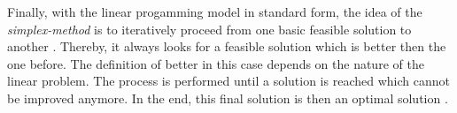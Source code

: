 Finally, with the linear progamming model in standard form, the idea of the \textit{simplex-method}
is to iteratively proceed from one basic feasible solution to another .
Thereby, it always looks for a feasible solution which is better then the one before. 
The definition of better in this case depends on the nature of the linear problem. 
The process is performed until a solution is reached which cannot 
be improved anymore. In the end, this final solution is then an optimal solution . 

\clearpage
\begin{comment}



# market design
Mathematical Optimization plays a central role in the design and analysis of multi-object 
markets and also provides a central foundation for theoretical models of mulit-object markets. 

However, market design is more than mathematical programming, as it takes into consideration bidding
strategies and human behavior. Ignoring bidding strategies and different types of manipulation 
in market-based resource allocation is like optimizing a problem with the wrong parameters. 

Overall, makret design aims at design principles and rules for market institutions which are robust
against manupulation and allow bidders to express their preferences, so that the designer can aim 
for good or even optimal allocations. This is similar to network security, where designers aim 
for secure network protocols that are hard to tamper with, 
knowing that there is no absolute security

# closed order book

\end{comment}



